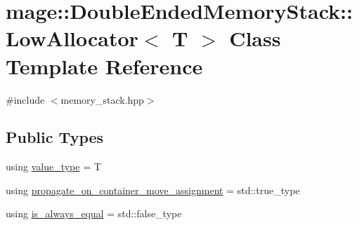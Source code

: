 \hypertarget{classmage_1_1_double_ended_memory_stack_1_1_low_allocator}{}\section{mage\+:\+:Double\+Ended\+Memory\+Stack\+:\+:Low\+Allocator$<$ T $>$ Class Template Reference}
\label{classmage_1_1_double_ended_memory_stack_1_1_low_allocator}


{\ttfamily \#include $<$memory\+\_\+stack.\+hpp$>$}

\subsection*{Public Types}
\begin{DoxyCompactItemize}
\item 
using \mbox{\hyperlink{classmage_1_1_double_ended_memory_stack_1_1_low_allocator_a38357d7dde55731d76644c13e64b03a6}{value\+\_\+type}} = T
\item 
using \mbox{\hyperlink{classmage_1_1_double_ended_memory_stack_1_1_low_allocator_ae864e2014f35dc1165e84de06018364b}{propagate\+\_\+on\+\_\+container\+\_\+move\+\_\+assignment}} = std\+::true\+\_\+type
\item 
using \mbox{\hyperlink{classmage_1_1_double_ended_memory_stack_1_1_low_allocator_ab42cfced82fe7790a27d066fe299513b}{is\+\_\+always\+\_\+equal}} = std\+::false\+\_\+type
\end{DoxyCompactItemize}
